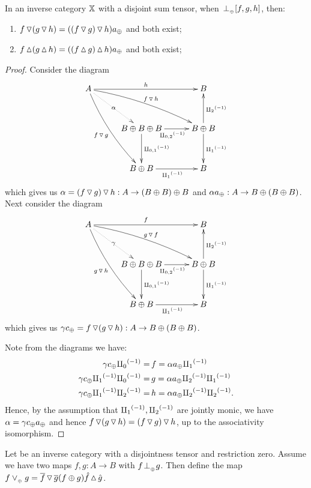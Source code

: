 \begin{lemma}\label{lem:tjdown_and_tjup_associate}
  In an inverse category $\mathbb{X}$ with a disjoint sum tensor, when ${}_{{}_{}}{\perp_{{}_{\oplus}}} [f,g,h]$, then:
  \begin{enumerate}
    \item   $f \operatorname{\triangledown} (g \operatorname{\triangledown} h) = ((f \operatorname{\triangledown} g) \operatorname{\triangledown} h) a_{\oplus}$ and both exist;
    \item   $f \operatorname{\vartriangle} (g \operatorname{\vartriangle} h) = ((f \operatorname{\vartriangle} g) \operatorname{\vartriangle} h) a_{\oplus}$ and both exist;
  \end{enumerate}
\end{lemma}
\begin{proof}
  Consider the diagram
  \[
    \xymatrix@C+5pt@R+10pt{
      A \ar@/_/[ddr]_{f\tjdown g} \ar@/^/[drr]^{f\tjdown h} \ar@{.>}[dr]|-{\alpha} \ar[rr]^{h}
        & & B \\
        & B\+B\+B \ar[d]^{\icp{0,1}} \ar[r]_{\icp{0,2}} & B\+B \ar[d]^{\icpa} \ar[u]_{\icpb} \\
        & B\+B \ar[r]_{\icpa} & B
    }
  \]
  which gives us $\alpha = (f \operatorname{\triangledown} g) \operatorname{\triangledown} h: A \to (B\oplus B)\oplus B$ and
  $\alpha a_{\oplus} :A \to B\oplus(B\oplus B)$. Next consider the diagram
  \[
    \xymatrix@C+5pt@R+10pt{
      A \ar@/_/[ddr]_{g\tjdown h} \ar@/^/[drr]^{g\tjdown f} \ar@{.>}[dr]|-{\gamma} \ar[rr]^{f}
        & & B \\
        & B\+B\+B \ar[d]^{\icp{0,1}} \ar[r]_{\icp{0,2}} & B\+B \ar[d]^{\icpa} \ar[u]_{\icpb} \\
        & B\+B \ar[r]_{\icpa} & B
    }
  \]
  which gives us $\gamma c_{\oplus} = f \operatorname{\triangledown} (g\operatorname{\triangledown} h): A \to B\oplus(B\oplus B)$.

  Note from the diagrams we have:
  \begin{align*}
    \gamma c_{\oplus}  {\amalg_{0}}^{(-1)}         =\, &f  = \alpha a_{\oplus}{\amalg_{1}}^{(-1)}\\
    \gamma c_{\oplus}  {\amalg_{1}}^{(-1)} {\amalg_{0}}^{(-1)} =\, &g  = \alpha a_{\oplus}{\amalg_{2}}^{(-1)}{\amalg_{1}}^{(-1)}\\
    \gamma c_{\oplus}  {\amalg_{1}}^{(-1)} {\amalg_{2}}^{(-1)}   =\, & h = \alpha a_{\oplus}{\amalg_{2}}^{(-1)}{\amalg_{2}}^{(-1)}.
  \end{align*}
  Hence, by the assumption that ${\amalg_{1}}^{(-1)}, {\amalg_{2}}^{(-1)}$ are jointly monic, we have
  $\alpha = \gamma c_{\oplus}  a_{\oplus}$ and hence $f \operatorname{\triangledown} (g \operatorname{\triangledown} h) = (f \operatorname{\triangledown} g) \operatorname{\triangledown} h$,
  up to the associativity isomorphism.
\end{proof}
\begin{definition}\label{def:tensor_disjoint_join}
  Let \X be an inverse category with a disjointness tensor and restriction zero. Assume we have two
  maps $f,g: A \to B$ with $f{}_{{}_{}}{\perp_{{}_{\oplus}}} g$. Then define the map $f \vee_{{_{\oplus}}} g = \overline{f}\operatorname{\triangledown}\overline{g}
  (f\oplus g) \hat{f}\operatorname{\vartriangle}\hat{g}$.
\end{definition}


